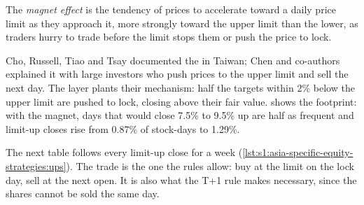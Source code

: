 \begin{definition}\label{def:s1:asia-specific-equity-strategies:magnet}
The \emph{magnet effect} is the tendency of prices to accelerate toward a daily price limit as they approach it, more strongly
toward the upper limit than the lower, as traders hurry to trade before the limit stops them or push the price to lock.
\end{definition}

Cho, Russell, Tiao and Tsay documented the  in Taiwan; Chen and co-authors explained it with large investors who push prices to the upper
limit and sell the next day. The layer plants their mechanism: half the targets within 2\% below the upper limit are pushed to lock, closing above
their fair value.  shows the footprint: with the magnet, days that would close 7.5\% to 9.5\% up
are half as frequent and limit-up closes rise from 0.87\% of stock-days to 1.29\%.

\begin{omfigure}

\label{fig:s1:asia-specific-equity-strategies:magnet}
\end{omfigure}

The next table follows every limit-up close for a week (\cref{lst:s1:asia-specific-equity-strategies:ups}). The trade is the one the rules allow:
buy at the limit on the lock day, sell at the next open. It is also what the T+1 rule makes necessary, since the shares cannot be sold the same day.

